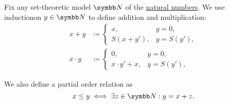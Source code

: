 \begin{Definition}\label{def:natural_number_operations}
  Fix any set-theoretic model \( \BN \) of the \hyperref[def:natural_numbers]{natural numbers}. We use induction\IND on \( y \in \BN \) to define addition and multiplication:
  \begin{align*}
    x + y &\coloneqq \begin{cases}
      x, &y = 0, \\
      S(x + y'), &y = S(y'),
    \end{cases}
    \\
    x \cdot y &\coloneqq \begin{cases}
      0, &y = 0, \\
      x \cdot y' + x, &y = S(y'),
    \end{cases}
  \end{align*}

  We also define a partial order relation as
  \begin{equation*}
    x \leq y \iff \exists z \in \BN: y = x + z.
  \end{equation*}
\end{Definition}


